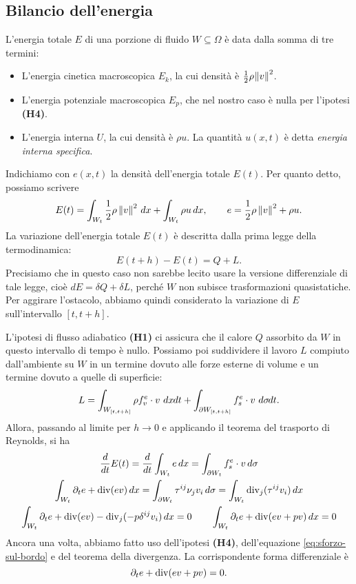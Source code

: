 \subsection*{Bilancio dell'energia}

L'energia totale $E$ di una porzione di fluido $W \subseteq \Omega$
è data dalla somma di tre termini:
\begin{itemize}
\item L'energia cinetica macroscopica $E_k$, la cui
	densità è $\frac{1}{2} \rho \!\!\: \left\lVert v\right\rVert^2$.
\item L'energia potenziale macroscopica $E_p$, che nel nostro caso
	è nulla per l'ipotesi \textbf{(H4)}.
\item L'energia interna $U$, la cui densità è $\rho u$.
	La quantità $u(x,t)$ è detta \emph{energia interna specifica}.
\end{itemize}
Indichiamo con $e(x,t)$ la densità dell'energia totale $E(t)$.
Per quanto detto, possiamo scrivere
\[
E(t) = \int_{W_t} \frac{1}{2} \rho \left\lVert v\right\rVert^2 \, dx
	 + \int_{W_t} \rho u \, dx,
\qquad e = \frac{1}{2} \rho \left\lVert v\right\rVert^2 + \rho u.
\]
La variazione dell'energia totale $E(t)$ è descritta dalla prima legge
della termodinamica:
\[
E(t+h) - E(t) = Q + L.
\]
Precisiamo che in questo caso non sarebbe lecito usare la versione
differenziale di tale legge, cioè $dE = \delta Q + \delta L$,
perché $W$ non subisce trasformazioni quasistatiche.
Per aggirare l'ostacolo, abbiamo quindi considerato la variazione di
$E$ sull'intervallo $[t,t+h]$.

L'ipotesi di flusso adiabatico \textbf{(H1)} ci assicura che il calore $Q$
assorbito da $W$ in questo intervallo di tempo è nullo.
Possiamo poi suddividere il lavoro $L$ compiuto dall'ambiente
su $W$ in un termine dovuto alle forze esterne di volume e un
termine dovuto a quelle di superficie:
\[
L = \int_{W_{[t,t+h]}} \rho f_v^e \cdot v \,\, dx\!\!\!\;\, dt
  + \int_{\partial W_{[t,t+h]}} f_s^e \cdot v \,\, d\sigma\!\!\!\:\, dt.
\]
Allora, passando al limite per $h \to 0$ e applicando il teorema del
trasporto di Reynolds, si ha
\begin{gather*}
\frac{d}{dt} E(t)
	= \frac{d}{dt} \int_{W_t} e \, dx
	= \int_{\partial W_t} f_s^e \cdot v \, d\sigma \\
\int_{W_t} \partial_t e + \operatorname{div}(ev) \, dx
	= \int_{\partial W_t} \tau^{ij} \nu_j v_i \, d\sigma
	= \int_{W_t} \operatorname{div}_j(\tau^{ij} v_i) \, dx \\
\int_{W_t} \partial_t e + \operatorname{div}(ev) - \operatorname{div}_j(-p \delta^{ij} v_i) \, dx = 0
	\qquad \int_{W_t} \partial_t e + \operatorname{div}(ev+pv) \, dx = 0
\end{gather*}
Ancora una volta, abbiamo fatto uso dell'ipotesi \textbf{(H4)},
dell'equazione \eqref{eq:sforzo-sul-bordo} e del teorema della divergenza.
La corrispondente forma differenziale è
\begin{equation} \label{eq:bilancio-energia}
\partial_t e + \operatorname{div}(ev+pv) = 0.
\end{equation}


